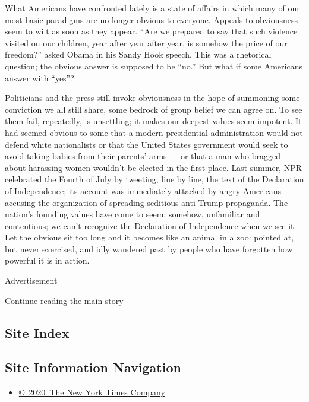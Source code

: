 What Americans have confronted lately is a state of affairs in which
many of our most basic paradigms are no longer obvious to everyone.
Appeals to obviousness seem to wilt as soon as they appear. ``Are we
prepared to say that such violence visited on our children, year after
year after year, is somehow the price of our freedom?'' asked Obama in
his Sandy Hook speech. This was a rhetorical question; the obvious
answer is supposed to be ``no.'' But what if some Americans answer with
``yes''?

Politicians and the press still invoke obviousness in the hope of
summoning some conviction we all still share, some bedrock of group
belief we can agree on. To see them fail, repeatedly, is unsettling; it
makes our deepest values seem impotent. It had seemed obvious to some
that a modern presidential administration would not defend white
nationalists or that the United States government would seek to avoid
taking babies from their parents' arms --- or that a man who bragged
about harassing women wouldn't be elected in the first place. Last
summer, NPR celebrated the Fourth of July by tweeting, line by line, the
text of the Declaration of Independence; its account was immediately
attacked by angry Americans accusing the organization of spreading
seditious anti-Trump propaganda. The nation's founding values have come
to seem, somehow, unfamiliar and contentious; we can't recognize the
Declaration of Independence when we see it. Let the obvious sit too long
and it becomes like an animal in a zoo: pointed at, but never exercised,
and idly wandered past by people who have forgotten how powerful it is
in action.

Advertisement

\protect\hyperlink{after-bottom}{Continue reading the main story}

\hypertarget{site-index}{%
\subsection{Site Index}\label{site-index}}

\hypertarget{site-information-navigation}{%
\subsection{Site Information
Navigation}\label{site-information-navigation}}

\begin{itemize}
\tightlist
\item
  \href{https://help.nytimes3xbfgragh.onion/hc/en-us/articles/115014792127-Copyright-notice}{©~2020~The
  New York Times Company}
\end{itemize}

